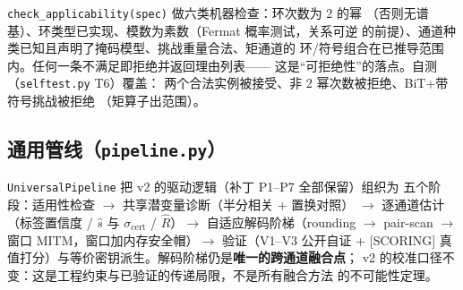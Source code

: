 \documentclass[11pt,a4paper]{ctexart}
\begin{document}
\begin{table}[htbp]\centering\small
{}%
\end{table}

\texttt{check\_applicability(spec)} 做六类机器检查：环次数为 2 的幂
（否则无谱基）、环类型已实现、模数为素数（Fermat 概率测试，关系可逆
的前提）、通道种类已知且声明了掩码模型、挑战重量合法、矩通道的
环/符号组合在已推导范围内。任何一条不满足即拒绝并返回理由列表——
这是``可拒绝性''的落点。自测（\texttt{selftest.py} T6）覆盖：
两个合法实例被接受、非 2 幂次数被拒绝、BiT+带符号挑战被拒绝
（矩算子出范围）。

\subsection{通用管线（\texttt{pipeline.py}）}

\texttt{UniversalPipeline} 把 v2 的驱动逻辑（补丁 P1--P7 全部保留）组织为
五个阶段：适用性检查 $\to$ 共享潜变量诊断（半分相关 + 置换对照）
$\to$ 逐通道估计（标签置信度 / $\hat s$ 与 $\sigma_{\mathrm{cert}}$ /
$\hat R$）$\to$ 自适应解码阶梯（rounding $\to$ pair-scan $\to$ 窗口
MITM，窗口加内存安全帽）$\to$ 验证（V1--V3 公开自证 + [SCORING]
真值打分）与等价密钥派生。解码阶梯仍是\textbf{唯一的跨通道融合点}；
v2 的校准口径不变：这是工程约束与已验证的传递局限，不是所有融合方法
的不可能性定理。
\end{document}
